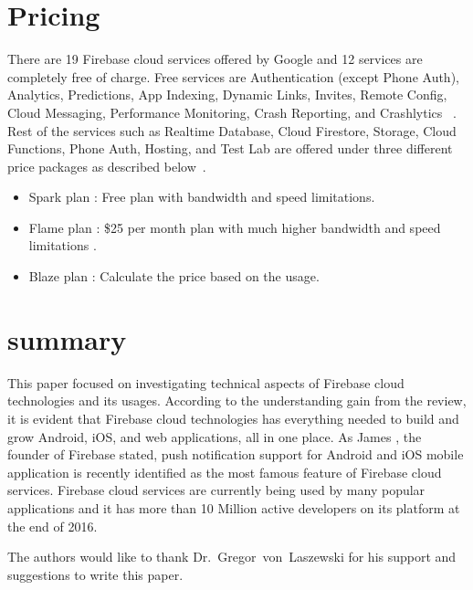 \section{Pricing}
There are 19 Firebase cloud services offered by Google and 12 services are 
completely free of charge. Free services are Authentication (except Phone 
Auth), Analytics, Predictions, App Indexing, Dynamic Links, Invites, Remote 
Config, Cloud Messaging, Performance Monitoring, Crash Reporting, and 
Crashlytics ~\cite{hid-sp18-409-www-firebase-pricing}. Rest of the services 
such as Realtime Database, Cloud Firestore, Storage, Cloud Functions, Phone 
Auth, Hosting, and Test Lab are offered under three different price packages as 
described below~\cite{hid-sp18-409-www-firebase-pricing}.

\begin{itemize}
	\item Spark plan : Free plan with bandwidth and speed limitations.
	\item Flame plan : \$25 per month plan with much higher bandwidth and speed 
	limitations .
	\item Blaze plan : Calculate the price based on the usage.
\end{itemize}

\section{summary}
This paper focused on investigating technical aspects of Firebase cloud 
technologies and its usages. According to the understanding gain from the 
review, it is evident that Firebase cloud technologies has everything needed to 
build and grow Android, iOS, and web applications, all in one place. As James 
\cite{hid-sp18-409-www-firebase}, the founder of Firebase stated, push 
notification support for Android and iOS mobile application is recently 
identified as the most famous feature of Firebase cloud services. Firebase 
cloud services are currently being used by many popular applications and it has 
more than 10 Million active developers on its platform  at the end of 
2016\cite{hid-sp18-409-www-firebase}.

\begin{acks}

  The authors would like to thank Dr.~Gregor~von~Laszewski for his
  support and suggestions to write this paper.

\end{acks}


 

